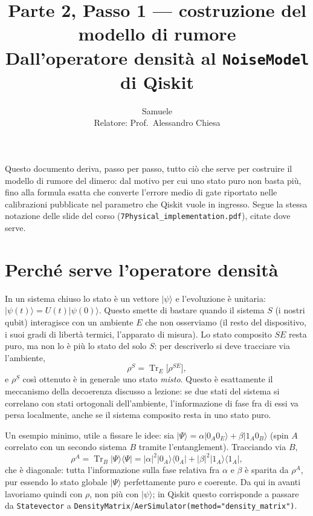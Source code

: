\documentclass[11pt,a4paper]{article}
\title{Parte 2, Passo 1 --- costruzione del modello di rumore\\
\large Dall'operatore densità al \texttt{NoiseModel} di Qiskit}
\author{Samuele \\ Relatore: Prof.\ Alessandro Chiesa}
\date{}
\newcommand{\ket}[1]{\lvert #1 \rangle}
\newcommand{\bra}[1]{\langle #1 \rvert}
\newcommand{\Tr}{\operatorname{Tr}}
\begin{document}
\maketitle
\tableofcontents

\bigskip
\noindent Questo documento deriva, passo per passo, tutto ciò che serve per costruire
il modello di rumore del dimero: dal motivo per cui uno stato puro non basta più, fino
alla formula esatta che converte l'errore medio di gate riportato nelle calibrazioni
pubblicate nel parametro che Qiskit vuole in ingresso. Segue la stessa notazione delle
slide del corso (\texttt{7Physical\_\allowbreak implementation.pdf}), citate dove serve.

\section{Perché serve l'operatore densità}

In un sistema chiuso lo stato è un vettore $\ket{\psi}$ e l'evoluzione è unitaria:
$\ket{\psi(t)}=U(t)\ket{\psi(0)}$. Questo smette di bastare quando il sistema $S$ (i
nostri qubit) interagisce con un ambiente $E$ che non osserviamo (il resto del
dispositivo, i suoi gradi di libertà termici, l'apparato di misura). Lo stato
composito $SE$ resta puro, ma non lo è più lo stato del solo $S$: per descriverlo si
deve tracciare via l'ambiente,
\begin{equation}
\rho^S = \Tr_E\!\big[\rho^{SE}\big],
\end{equation}
e $\rho^S$ così ottenuto è in generale uno stato \emph{misto}. Questo è esattamente il
meccanismo della decoerenza discusso a lezione: se due stati del sistema si
correlano con stati ortogonali dell'ambiente, l'informazione di fase fra di essi va
persa localmente, anche se il sistema composito resta in uno stato puro.

Un esempio minimo, utile a fissare le idee: sia $\ket{\Psi}=\alpha\ket{0_A0_E}+
\beta\ket{1_A0_B}$ (spin $A$ correlato con un secondo sistema $B$ tramite
l'entanglement). Tracciando via $B$,
\begin{equation}
\rho^A = \Tr_B\ket{\Psi}\bra{\Psi} = |\alpha|^2\ket{0_A}\bra{0_A} +
|\beta|^2\ket{1_A}\bra{1_A},
\end{equation}
che è diagonale: tutta l'informazione sulla fase relativa fra $\alpha$ e $\beta$ è
sparita da $\rho^A$, pur essendo lo stato globale $\ket{\Psi}$ perfettamente puro e
coerente. Da qui in avanti lavoriamo quindi con $\rho$, non più con $\ket{\psi}$; in
Qiskit questo corrisponde a passare da \texttt{Statevector} a
\texttt{DensityMatrix}/\texttt{AerSimulator(method="density\_matrix")}.
\end{document}
